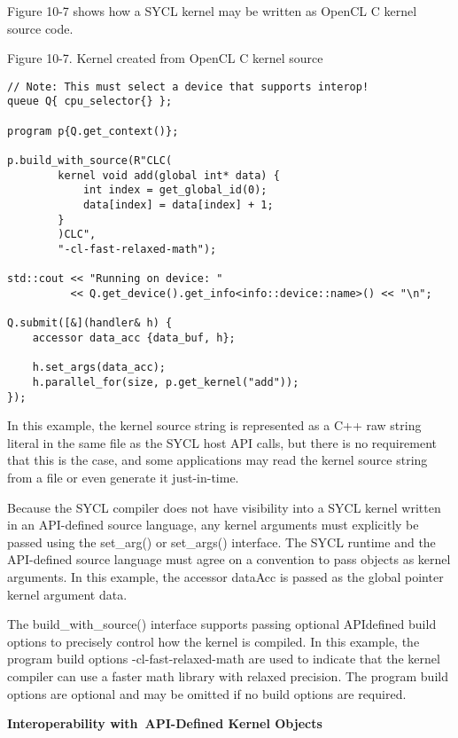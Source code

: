 Figure 10-7 shows how a SYCL kernel may be written as OpenCL C kernel source code.\par

\hspace*{\fill} \par %
Figure 10-7. Kernel created from OpenCL C kernel source
\begin{lstlisting}[caption={}]
// Note: This must select a device that supports interop!
queue Q{ cpu_selector{} };

program p{Q.get_context()};

p.build_with_source(R"CLC(
		kernel void add(global int* data) {
			int index = get_global_id(0);
			data[index] = data[index] + 1;
		}
		)CLC",
		"-cl-fast-relaxed-math");
		
std::cout << "Running on device: "
		  << Q.get_device().get_info<info::device::name>() << "\n";

Q.submit([&](handler& h) {
	accessor data_acc {data_buf, h};
	
	h.set_args(data_acc);
	h.parallel_for(size, p.get_kernel("add"));
});
\end{lstlisting}

In this example, the kernel source string is represented as a C++ raw string literal in the same file as the SYCL host API calls, but there is no requirement that this is the case, and some applications may read the kernel source string from a file or even generate it just-in-time.\par

Because the SYCL compiler does not have visibility into a SYCL kernel written in an API-defined source language, any kernel arguments must explicitly be passed using the set\_arg() or set\_args() interface. The SYCL runtime and the API-defined source language must agree on a convention to pass objects as kernel arguments. In this example, the accessor dataAcc is passed as the global pointer kernel argument data.\par

The build\_with\_source() interface supports passing optional APIdefined build options to precisely control how the kernel is compiled. In this example, the program build options -cl-fast-relaxed-math are used to indicate that the kernel compiler can use a faster math library with relaxed precision. The program build options are optional and may be omitted if no build options are required.\par

\hspace*{\fill} \par %
\textbf{Interoperability with API-Defined Kernel Objects}

